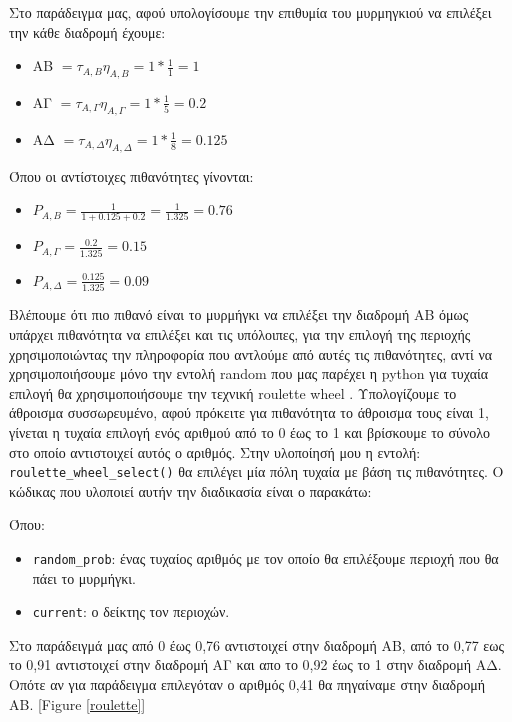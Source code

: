 Στο παράδειγμα μας, αφού υπολογίσουμε την επιθυμία του μυρμηγκιού να επιλέξει την κάθε διαδρομή έχουμε:

\begin{itemize}
    \item AΒ $= τ_{A,B}η_{A,B}=1*\frac{1}{1}=1$ 
    \item AΓ $= τ_{A,Γ}η_{A,Γ}=1*\frac{1}{5}=0.2$
    \item AΔ $= τ_{A,Δ}η_{A,Δ}=1*\frac{1}{8}=0.125$
\end{itemize}

Όπου οι αντίστοιχες πιθανότητες γίνονται:

\begin{itemize}
    \item $P_{A,B}=\frac{1}{1+0.125+0.2}=\frac{1}{1.325}=0.76$
    \item $P_{A,Γ}=\frac{0.2}{1.325}=0.15$
    \item $P_{A,Δ}=\frac{0.125}{1.325}=0.09$
\end{itemize}

Βλέπουμε ότι πιο πιθανό είναι το μυρμήγκι να επιλέξει την διαδρομή ΑΒ όμως υπάρχει πιθανότητα να επιλέξει και τις υπόλοιπες, για την επιλογή της περιοχής χρησιμοποιώντας την πληροφορία που αντλούμε από αυτές τις πιθανότητες, αντί να χρησιμοποιήσουμε μόνο την εντολή random που μας παρέχει η python για τυχαία επιλογή θα χρησιμοποιήσουμε την τεχνική roulette wheel \cite{lipowski2012roulette}. Υπολογίζουμε το άθροισμα συσσωρευμένο, αφού πρόκειτε για πιθανότητα το άθροισμα τους είναι 1, γίνεται η τυχαία επιλογή ενός αριθμού από το 0 έως το 1 και βρίσκουμε το σύνολο στο οποίο αντιστοιχεί αυτός ο αριθμός.
Στην υλοποίησή μου η εντολή: \verb|roulette_wheel_select()| θα επιλέγει μία πόλη τυχαία με βάση τις πιθανότητες. Ο κώδικας που υλοποιεί αυτήν την διαδικασία είναι ο παρακάτω: 

Όπου:
\begin{itemize}
    \item \verb|random_prob|: ένας τυχαίος αριθμός με τον οποίο θα επιλέξουμε περιοχή που θα πάει το μυρμήγκι.
    \item \verb|current|: ο δείκτης τον περιοχών.
\end{itemize}

Στο παράδειγμά μας από 0 έως 0,76 αντιστοιχεί στην διαδρομή ΑΒ, από το 0,77 εως το 0,91 αντιστοιχεί στην διαδρομή ΑΓ και απο το 0,92 έως το 1 στην διαδρομή ΑΔ. Οπότε αν για παράδειγμα επιλεγόταν ο αριθμός 0,41 θα πηγαίναμε στην διαδρομή ΑΒ. [Figure \ref{roulette}]
 
